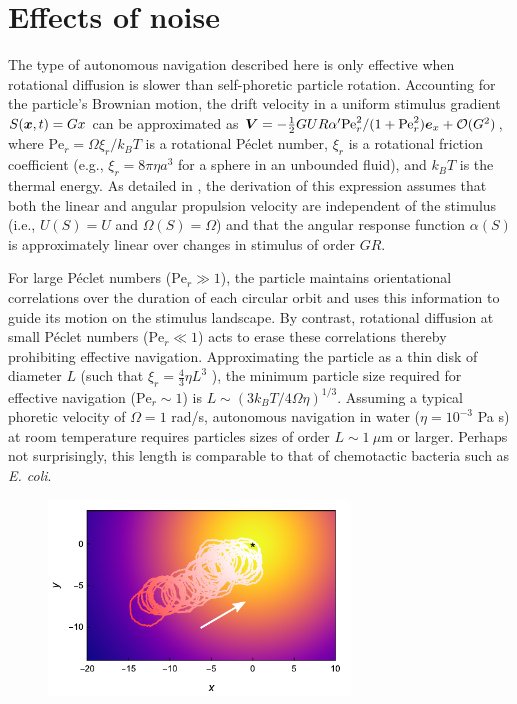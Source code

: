 \section{Effects of noise} 
The type of autonomous navigation described here is only effective when rotational diffusion is slower than self-phoretic particle rotation.  Accounting for the particle's Brownian motion, the drift velocity in a uniform stimulus gradient $S(\boldsymbol{x},t)=G x$ can be approximated as $\boldsymbol{V}=-\tfrac{1}{2} G U R \alpha' \text{Pe}^2_r / (1+ \text{Pe}_r^2) \boldsymbol{e}_x +\mathcal{O}(G^2)$, where $\text{Pe}_r =\Omega\xi_r/k_B T$ is a rotational P\'eclet number, $\xi_r$ is a rotational friction coefficient (e.g., $\xi_r=8\pi\eta a^3$ for a sphere in an unbounded fluid), and $k_B T$ is the thermal energy.  As detailed in \autocite{Supp}, the derivation of this expression assumes that both the linear and angular propulsion velocity are independent of the stimulus (i.e., $U(S)=U$ and $\Omega(S)=\Omega$) and that the angular response function $\alpha(S)$ is approximately linear over changes in stimulus of order $GR$.  

For large P\'eclet numbers ($\text{Pe}_r\gg1$), the particle maintains orientational correlations over the duration of each circular orbit and uses this information to guide its motion on the stimulus landscape.  By contrast, rotational diffusion at small P\'eclet numbers ($\text{Pe}_r\ll1$) acts to erase these correlations thereby prohibiting effective navigation. Approximating the particle as a thin disk of diameter $L$ (such that $\xi_r=\tfrac{4}{3}\eta L^3$ \autocite{Kim2005}), the minimum particle size required for effective navigation ($\text{Pe}_r\sim1$) is $L\sim(3k_B T/4\Omega\eta)^{1/3}$.  Assuming a typical phoretic velocity of $\Omega=1$ rad/s, autonomous navigation in water ($\eta=10^{-3}$ Pa s) at room temperature requires particles sizes of order $L\sim 1~\mu$m or larger. Perhaps not surprisingly, this length is comparable to that of chemotactic bacteria such as \emph{E. coli}. 

\begin{figure}[h!]
     \centering
     \includegraphics[width=8cm]{figures/4_4.pdf}
     \caption{}
     \label{fig:4.4}
 \end{figure}

